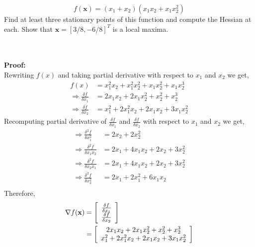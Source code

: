 \documentclass[a4paper,10pt]{article}
\begin{document}
\begin{enumerate}
\begin{taskbox}
\begin{equation}
    f(\mathbf{x}) = (x_1 + x_2)(x_1x_2 + x_1 x_2^2)
    \label{eq:q3}
    \end{equation}
    Find at least three stationary points of this function  and compute the Hessian at each. Show that $\mathbf{x}=[3/8, -6/8]^T$ is a local maxima.
    \end{taskbox}
    \\ \\ \textbf{Proof:} \\
    Rewriting $f(x)$ and taking partial derivative with respect to $x_1$ and $x_2$ we get,
    \begin{equation}
        \begin{split}
            f(x) & = x_1^2x_2 + x_1^2x_2^2 + x_1x_2^2 + x_1x_2^3 \\
            \Rightarrow \frac{\delta f}{\delta x_1} & = 2x_1x_2 + 2x_1x_2^2 + x_2^2 + x_2^3 \\
            \Rightarrow \frac{\delta f}{\delta x_2} & = x_1^2 + 2x_1^2x_2 + 2x_1x_2 + 3x_1x_2^2
        \end{split}
    \end{equation}
    Recomputing partial derivative of $\frac{\delta f}{\delta x_1}$ and $\frac{\delta f}{\delta x_2}$ with respect to $x_1$ and $x_2$ we get,
    \begin{equation}
        \begin{split}
            \Rightarrow \frac{\delta^2f}{\delta x_1^2} & = 2x_2 + 2x_2^2 \\
            \Rightarrow \frac{\delta^2f}{\delta x_1x_2} & = 2x_1 + 4x_1x_2 + 2x_2 + 3x_2^2 \\
            \Rightarrow \frac{\delta^2f}{\delta x_2x_1} & = 2x_1 + 4x_1x_2 + 2x_2 + 3x_2^2 \\
            \Rightarrow \frac{\delta^2f}{\delta x_2^2} & = 2x_1 + 2x_1^2 + 6x_1x_2 \\
        \end{split}
    \end{equation}
    Therefore,
    \begin{equation}
        \begin{split}
            \nabla f(\mathbf{x}) & =\left[\begin{array}{c c} \frac{\delta f}{\delta x_1} \\ \frac{\delta f}{\delta x_2} \end{array} \right] \\
            & = \left[\begin{array}{c c} 2x_1x_2 + 2x_1x_2^2 + x_2^2 + x_2^3 \\ x_1^2 + 2x_1^2x_2 + 2x_1x_2 + 3x_1x_2^2 \end{array} \right] 

\end{split}
\end{equation}
\end{enumerate}
\end{document}
